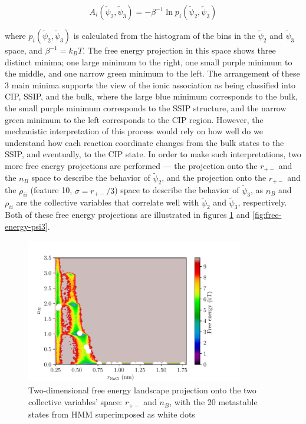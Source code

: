 \begin{spacing}{2.0}
    \begin{equation}
        A_i(\tilde{\psi}_2,\tilde{\psi}_3) = -\beta^{-1}\ln p_i(\tilde{\psi}_2,\tilde{\psi}_3)
    \end{equation}

    \noindent where $p_i(\tilde{\psi}_2,\tilde{\psi}_3)$ is calculated from the histogram of the bins in the $\tilde{\psi}_2$ and $\tilde{\psi}_3$ 
    space, and $\beta^{-1} = k_B T$. The free energy projection in this space shows three distinct minima; one large minimum to the right, one 
    small purple minimum to the middle, and one narrow green minimum to the left. The arrangement of these 3 main minima supports the view of the 
    ionic association as being classified into CIP, SSIP, and the bulk, where the large blue minimum corresponds to the bulk, the small purple 
    minimum corresponds to the SSIP structure, and the narrow green minimum to the left corresponds to the CIP region. However, the mechanistic 
    interpretation of this process would rely on how well do we understand how each reaction coordinate changes from the bulk states to the SSIP, 
    and eventually, to the CIP state. In order to make such interpretations, two more free energy projections are performed --- the projection onto 
    the $r_{+-}$ and the $n_B$ space to describe the behavior of $\tilde{\psi}_2$, and the projection onto the $r_{+-}$ and the $\rho_{ii}$ (feature 
    10, $\sigma = r_{+-}/3$) space to describe the behavior of $\tilde{\psi}_3$, as $n_B$ and $\rho_{ii}$ are the collective variables that correlate 
    well with $\tilde{\psi}_2$ and $\tilde{\psi}_3$, respectively. Both of these free energy projections are illustrated in figures 
    \ref{fig:free-energy-psi2} and \ref{fig:free-energy-psi3}.

    \begin{figure}[H]
        \centering
        \includegraphics[width=0.85\textwidth]{./figs/fig3-07}
        \caption{Two-dimensional free energy landscape projection onto the two collective variables’ space: $r_{+-}$ and $n_B$, with the 20 metastable 
                 states from HMM superimposed as white dots}
        \label{fig:free-energy-psi2}
    \end{figure}


\end{spacing}
